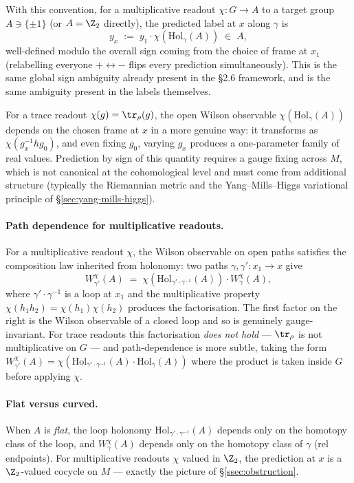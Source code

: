 With this convention, for a multiplicative readout $\chi\colon G\to A$
to a target group $A\ni\{\pm 1\}$ (or $A=\Z_2$ directly), the
predicted label at $x$ along $\gamma$ is
\[
   y_x \;:=\; y_1\cdot\chi(\mathrm{Hol}_\gamma(A)) \;\in\; A,
\]
well-defined modulo the overall sign coming from the choice of
frame at $x_1$ (relabelling everyone $+\leftrightarrow -$ flips
every prediction simultaneously). This is the same global sign
ambiguity already present in the §2.6 framework, and is the same
ambiguity present in the labels themselves.

For a trace readout $\chi(g)=\tr_\rho(g)$, the open Wilson
observable $\chi(\mathrm{Hol}_\gamma(A))$ depends on the chosen
frame at $x$ in a more genuine way: it transforms as
$\chi(g_x^{-1}h g_0)$, and even fixing $g_0$, varying $g_x$ produces
a one-parameter family of real values. Prediction by sign of this
quantity requires a gauge fixing across $M$, which is not
canonical at the cohomological level and must come from additional
structure (typically the Riemannian metric and the Yang--Mills--Higgs
variational principle of \S\ref{sec:yang-mills-higgs}).

\paragraph{Path dependence for multiplicative readouts.} For a
multiplicative readout $\chi$, the Wilson observable on open paths
satisfies the composition law inherited from holonomy: two paths
$\gamma,\gamma'\colon x_1\to x$ give
\[
   W_{\gamma'}^\chi(A) \;=\;
   \chi(\mathrm{Hol}_{\gamma'\cdot\gamma^{-1}}(A))\cdot W_\gamma^\chi(A),
\]
where $\gamma'\cdot\gamma^{-1}$ is a loop at $x_1$ and the multiplicative
property $\chi(h_1 h_2)=\chi(h_1)\chi(h_2)$ produces the factorisation.
The first factor on the right is the Wilson observable of a closed
loop and so is genuinely gauge-invariant. For trace readouts this
factorisation \emph{does not hold} --- $\tr_\rho$ is not multiplicative
on $G$ --- and path-dependence is more subtle, taking the form
$W_{\gamma'}^\chi(A)=\chi(\mathrm{Hol}_{\gamma'\cdot\gamma^{-1}}(A)\cdot
\mathrm{Hol}_\gamma(A))$ where the product is taken inside $G$ before
applying $\chi$.

\paragraph{Flat versus curved.} When $A$ is \emph{flat}, the loop
holonomy $\mathrm{Hol}_{\gamma'\cdot\gamma^{-1}}(A)$ depends only on
the homotopy class of the loop, and $W_\gamma^\chi(A)$ depends only
on the homotopy class of $\gamma$ (rel endpoints). For
multiplicative readouts $\chi$ valued in $\Z_2$, the prediction at
$x$ is a $\Z_2$-valued cocycle on $M$ --- exactly the picture of
\S\ref{ssec:obstruction}.


